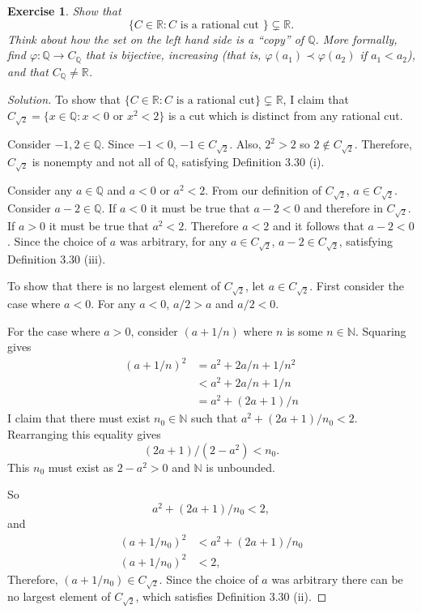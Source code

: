 \documentclass{amsart}
\newtheorem{exercise}[theorem]{Exercise}
\newcommand{\N}{\mathbb N}
\newcommand{\Q}{\mathbb Q}
\newcommand{\R}{\mathbb R}
\newcommand{\1}{\mathds{1}}
\def \R {{\mathbb {R}}}
\def \N {{\mathbb {N}}}
\def \phi {{\varphi}}
\numberwithin{equation}{section}
\numberwithin{theorem}{section}
\begin{document}
\begin{exercise}
	Show that
	\[
	\{ C \in \R : C \text{ is a rational cut } \}
	\subsetneq \R.
	\]
	Think about how the set on the left hand side is a ``copy'' of $\Q$.  More formally, find $\phi: \Q \to C_\Q$ that is bijective, increasing (that is, $\phi(a_1) \prec \phi(a_2)$ if $a_1 < a_2$), and that $C_\Q \neq \R$.
\end{exercise}

\begin{proof}[Solution]
	
	To show that $\{C\in\R: C \text{ is a rational cut}\}\subsetneq \R$, I claim that $C_{\sqrt{2}} = \{x\in\Q: x<0 \text{ or } x^2<2\}$ is a cut which is distinct from any rational cut.
	
	Consider $-1,2\in\Q$. Since $-1<0$, $-1\in C_{\sqrt{2}}$. Also, $2^2 > 2$ so $2\notin C_{\sqrt{2}}$. Therefore, $C_{\sqrt{2}}$ is nonempty and not all of $\Q$, satisfying Definition 3.30 (i).
	
	Consider any $a\in\Q$ and $a<0$ or $a^2<2$. From our definition of $C_{\sqrt{2}}$, $a\in C_{\sqrt{2}}$. Consider $a-2\in \Q$. If $a<0$ it must be true that $a-2<0$ and therefore in $C_{\sqrt{2}}$. If $a>0$ it must be true that $a^2 < 2$. Therefore $a<2$ and it follows that $a-2<0$. Since the choice of $a$ was arbitrary, for any $a\in C_{\sqrt{2}}$, $a-2 \in C_{\sqrt{2}}$, satisfying Definition 3.30 (iii).
	
	To show that there is no largest element of $C_{\sqrt{2}}$, let $a\in C_{\sqrt{2}}$. First consider the case where $a<0$. For any $a<0$, $a/2 > a$ and $a/2 < 0$.
	
	For the case where $a>0$, consider $(a+1/n)$ where $n$ is some $n\in\N$. Squaring gives
	\[\begin{split}
		(a+1/n)^2 &= a^2 + 2a/n + 1/n^2\\
				&<a^2 + 2a/n + 1/n\\
				&=a^2 + (2a+1)/n
	\end{split}\]
	I claim that there must exist $n_0\in\N$ such that $a^2 + (2a+1)/n_0 < 2$. Rearranging this equality gives $$(2a+1)/(2-a^2) < n_0.$$ This $n_0$ must exist as $2-a^2 > 0$ and $\N$ is unbounded. 
	
	So $$a^2 + (2a+1)/n_0 < 2,$$ and 
	\[\begin{split}
		(a+1/n_0)^2 &< a^2 + (2a+1)/n_0\\
		(a+1/n_0)^2 &< 2,
	\end{split}\]
	Therefore, $(a+1/n_0) \in C_{\sqrt{2}}$. Since the choice of $a$ was arbitrary there can be no largest element of $C_{\sqrt{2}}$, which satisfies Definition 3.30 (ii). 
	

\end{proof}
\end{document}
